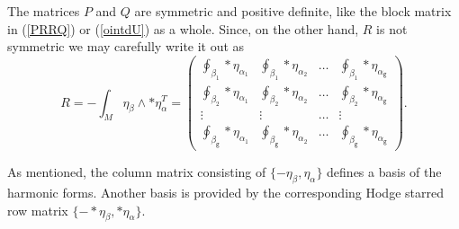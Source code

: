 \documentclass[reqno,12pt]{article}
\theoremstyle{plain}
\theoremstyle{definition}
\numberwithin{equation}{section}
\numberwithin{figure}{section}
\begin{document}
The matrices $P$ and $Q$ are symmetric and positive definite, like the block matrix in (\ref{PRRQ}) or (\ref{ointdU}) as a whole.
Since, on the other hand, $R$ is not symmetric we may carefully write it out as
$$
R=-\int_M \eta_\beta\wedge *\eta_\alpha^T
=\left(\begin{array}{ccccc}
\oint_{\beta_1}*\eta_{\alpha_1}& \oint_{\beta_1}*\eta_{\alpha_2}&\dots & \oint_{\beta_1}*\eta_{\alpha_{\texttt{g}}}\\
\oint_{\beta_2}*\eta_{\alpha_1}& \oint_{\beta_2}*\eta_{\alpha_2}&\dots & \oint_{\beta_2}*\eta_{\alpha_\texttt{g}}\\
\vdots &\vdots&\dots &\vdots\\
\oint_{\beta_\texttt{g}} *\eta_{\alpha_1}& \oint_{\beta_\texttt{g}}*\eta_{\alpha_2}&\dots & \oint_{\beta_\texttt{g}}*\eta_{\alpha_\texttt{g}}
\end{array}\right).
$$

As mentioned, the column matrix consisting of $\{-\eta_\beta, \eta_\alpha\}$ defines a basis of the harmonic forms.
Another basis is provided by the corresponding Hodge starred row matrix $\{-*\eta_\beta, *\eta_\alpha\}$.
\end{document}
